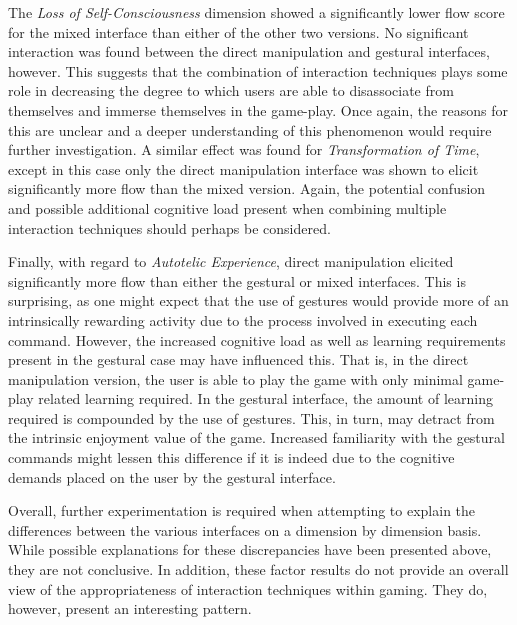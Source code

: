 The \emph{Loss of Self-Consciousness} dimension showed a significantly lower flow score for the mixed interface than either of the other two versions. No significant interaction was found between the direct manipulation and gestural interfaces, however. This suggests that the combination of interaction techniques plays some role in decreasing the degree to which users are able to disassociate from themselves and immerse themselves in the game-play. Once again, the reasons for this are unclear and a deeper understanding of this phenomenon would require further investigation. A similar effect was found for \emph{Transformation of Time}, except in this case only the direct manipulation interface was shown to elicit significantly more flow than the mixed version. Again, the potential confusion and possible additional cognitive load present when combining multiple interaction techniques should perhaps be considered.

Finally, with regard to \emph{Autotelic Experience}, direct manipulation elicited significantly more flow than either the gestural or mixed interfaces. This is surprising, as one might expect that the use of gestures would provide more of an intrinsically rewarding activity due to the process involved in executing each command. However, the increased cognitive load as well as learning requirements present in the gestural case may have influenced this. That is, in the direct manipulation version, the user is able to play the game with only minimal game-play related learning required. In the gestural interface, the amount of learning required is compounded by the use of gestures. This, in turn, may detract from the intrinsic enjoyment value of the game. Increased familiarity with the gestural commands might lessen this difference if it is indeed due to the cognitive demands placed on the user by the gestural interface.

Overall, further experimentation is required when attempting to explain the differences between the various interfaces on a dimension by dimension basis. While possible explanations for these discrepancies have been presented above, they are not conclusive. In addition, these factor results do not provide an overall view of the appropriateness of interaction techniques within gaming. They do, however, present an interesting pattern.

